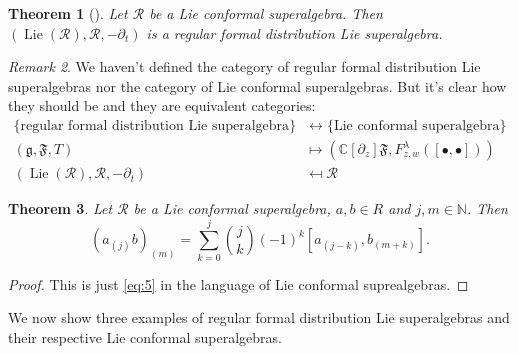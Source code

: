 \documentclass[a4paper, 12pt, reqno]{amsart}
\newtheorem{theorem}{Theorem}[subsection]
\theoremstyle{remark}
\newtheorem{remark}[theorem]{Remark}
\numberwithin{equation}{subsection}
\DeclareMathOperator{\Lie}{Lie}
\begin{document}
\begin{theorem}[{\cite[Proposition 2.6.4]{nozaradan_introduction_2008}}]
  \label{thr:5}
  Let $\mathcal{R}$ be a Lie conformal superalgebra.
  Then $(\Lie(\mathcal{R}), \mathcal{R},-\partial_t)$ is a regular formal distribution Lie superalgebra. 
\end{theorem}

\begin{remark}
  \label{rmk:5}
  We haven't defined the category of regular formal distribution Lie superalgebras nor the category of Lie conformal superalgebras.
  But it's clear how they should be and they are equivalent categories:
  \begin{align*}
    \{\text{regular formal distribution Lie superalgebra}\} &\leftrightarrow \{\text{Lie conformal superalgebra}\} \\
    (\mathfrak{g}, \mathfrak{F}, T) &\mapsto (\mathbb{C}[\partial_z]\mathfrak{F}, F^{\lambda}_{z, w}([\bullet, \bullet])) \\
    (\Lie(\mathcal{R}), \mathcal{R},-\partial_t) &\mapsfrom \mathcal{R}
  \end{align*}
\end{remark}

\begin{theorem}
  \label{thr:6}
  Let $\mathcal{R}$ be a Lie conformal superalgebra, $a, b \in R$ and $j, m \in \mathbb{N}$.
  Then
  \begin{equation*}
    (a_{(j)}b)_{(m)} = \sum_{k = 0}^j\binom{j}{k}(-1)^k[a_{(j - k)},b_{(m + k)}].
  \end{equation*}
\end{theorem}

\begin{proof}
  This is just \eqref{eq:5} in the language of Lie conformal suprealgebras.
\end{proof}

We now show three examples of regular formal distribution Lie superalgebras and their respective Lie conformal superalgebras.
\end{document}

